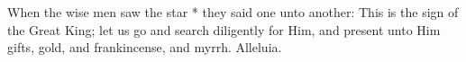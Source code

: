 When the wise men saw the star * they said one unto another: This is the sign of the Great King; let us go and search diligently for Him, and present unto Him gifts, gold, and frankincense, and myrrh. Alleluia.